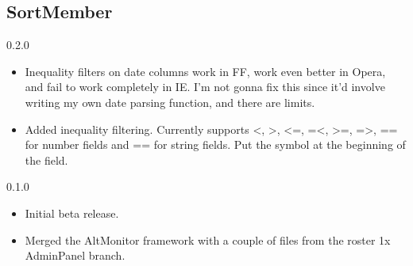 \documentclass[12pt, a4paper]{article}
\begin{document}
\subsection{SortMember}
\begin{description}
\item{0.2.0}
\begin{itemize}
\item Inequality filters on date columns work in FF, work even better in Opera,
   and fail to work completely in IE. I'm not gonna fix this since it'd involve
   writing my own date parsing function, and there are limits.
\item Added inequality filtering. Currently supports <, >, <=, =<, >=, =>, == for
   number fields and == for string fields. Put the symbol at the beginning of
   the field.
\end{itemize}

\item{0.1.0}
\begin{itemize}
\item Initial beta release.
\item Merged the AltMonitor framework with a couple of files from the roster 1x
   AdminPanel branch.
\end{itemize}
\end{description}
\end{document}
